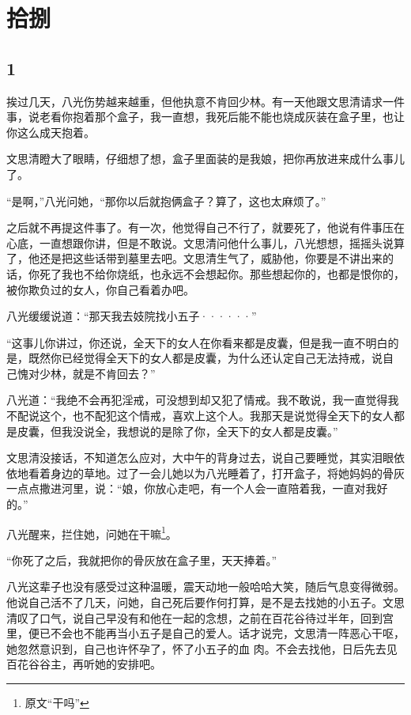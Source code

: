 \section{拾捌}

{\centering\subsection{1}}

挨过几天，八光伤势越来越重，但他执意不肯回少林。有一天他跟文思清请求一件事，说老看你抱着那个盒子，我一直想，我死后能不能也烧成灰装在盒子里，也让你这么成天抱着。

文思清瞪大了眼睛，仔细想了想，盒子里面装的是我娘，把你再放进来成什么事儿了。

“是啊，”八光问她，“那你以后就抱俩盒子？算了，这也太麻烦了。”

之后就不再提这件事了。有一次，他觉得自己不行了，就要死了，他说有件事压在心底，一直想跟你讲，但是不敢说。文思清问他什么事儿，八光想想，摇摇头说算了，他还是把这些话带到墓里去吧。文思清生气了，威胁他，你要是不讲出来的话，你死了我也不给你烧纸，也永远不会想起你。那些想起你的，也都是恨你的，被你欺负过的女人，你自己看着办吧。

八光缓缓说道：“那天我去妓院找小五子······”

“这事儿你讲过，你还说，全天下的女人在你看来都是皮囊，但是我一直不明白的是，既然你已经觉得全天下的女人都是皮囊，为什么还认定自己无法持戒，说自
己愧对少林，就是不肯回去？”

八光道：“我绝不会再犯淫戒，可没想到却又犯了情戒。我不敢说，我一直觉得我不配说这个，也不配犯这个情戒，喜欢上这个人。我那天是说觉得全天下的女人都是皮囊，但我没说全，我想说的是除了你，全天下的女人都是皮囊。”

文思清没接话，不知道怎么应对，大中午的背身过去，说自己要睡觉，其实泪眼依依地看着身边的草地。过了一会儿她以为八光睡着了，打开盒子，将她妈妈的骨灰一点点撒进河里，说：“娘，你放心走吧，有一个人会一直陪着我，一直对我好的。”

八光醒来，拦住她，问她在干嘛\footnote{原文“干吗”}。

“你死了之后，我就把你的骨灰放在盒子里，天天捧着。”

八光这辈子也没有感受过这种温暖，震天动地一般哈哈大笑，随后气息变得微弱。他说自己活不了几天，问她，自己死后要作何打算，是不是去找她的小五子。文思清叹了口气，说自己早没有和他在一起的念想，之前在百花谷待过半年，回到宫里，便已不会也不能再当小五子是自己的爱人。话才说完，文思清一阵恶心干呕，她忽然意识到，自己也许怀孕了，怀了小五子的血
肉。不会去找他，日后先去见百花谷谷主，再听她的安排吧。

